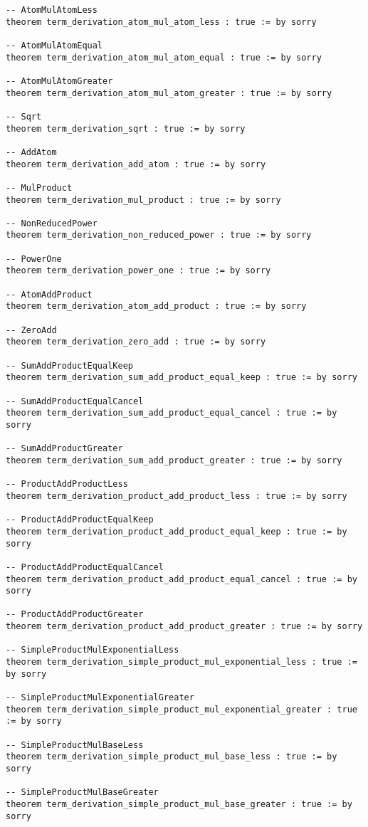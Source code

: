 \documentclass{article}
\begin{document}
\begin{tcolorbox}[colback=white!10, width=\linewidth]
\begin{lstlisting}[language=Lean4]
-- AtomMulAtomLess
theorem term_derivation_atom_mul_atom_less : true := by sorry

-- AtomMulAtomEqual
theorem term_derivation_atom_mul_atom_equal : true := by sorry

-- AtomMulAtomGreater
theorem term_derivation_atom_mul_atom_greater : true := by sorry

-- Sqrt
theorem term_derivation_sqrt : true := by sorry

-- AddAtom
theorem term_derivation_add_atom : true := by sorry

-- MulProduct
theorem term_derivation_mul_product : true := by sorry

-- NonReducedPower
theorem term_derivation_non_reduced_power : true := by sorry

-- PowerOne
theorem term_derivation_power_one : true := by sorry

-- AtomAddProduct
theorem term_derivation_atom_add_product : true := by sorry

-- ZeroAdd
theorem term_derivation_zero_add : true := by sorry

-- SumAddProductEqualKeep
theorem term_derivation_sum_add_product_equal_keep : true := by sorry

-- SumAddProductEqualCancel
theorem term_derivation_sum_add_product_equal_cancel : true := by sorry

-- SumAddProductGreater
theorem term_derivation_sum_add_product_greater : true := by sorry

-- ProductAddProductLess
theorem term_derivation_product_add_product_less : true := by sorry

-- ProductAddProductEqualKeep
theorem term_derivation_product_add_product_equal_keep : true := by sorry

-- ProductAddProductEqualCancel
theorem term_derivation_product_add_product_equal_cancel : true := by sorry

-- ProductAddProductGreater
theorem term_derivation_product_add_product_greater : true := by sorry

-- SimpleProductMulExponentialLess
theorem term_derivation_simple_product_mul_exponential_less : true := by sorry

-- SimpleProductMulExponentialGreater
theorem term_derivation_simple_product_mul_exponential_greater : true := by sorry

-- SimpleProductMulBaseLess
theorem term_derivation_simple_product_mul_base_less : true := by sorry

-- SimpleProductMulBaseGreater
theorem term_derivation_simple_product_mul_base_greater : true := by sorry


\end{lstlisting}
\end{tcolorbox}
\end{document}
